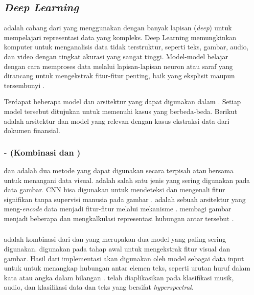 \subsection{\emph{Deep Learning}}
\label{subsec:dl}

\dlfl{} adalah cabang dari \ml{} yang menggunakan \annfull{} dengan banyak lapisan (\emph{deep}) untuk mempelajari representasi data yang kompleks. Deep Learning memungkinkan komputer untuk menganalisis data tidak terstruktur, seperti teks, gambar, audio, dan video dengan tingkat akurasi yang sangat tinggi. Model-model \dl{} belajar dengan cara memproses data melalui lapisan-lapisan neuron atau saraf yang dirancang untuk mengekstrak fitur-fitur penting, baik yang eksplisit maupun tersembunyi \parencite{Goodfellow-et-al-2016}. 

Terdapat beberapa model dan arsitektur yang dapat digunakan dalam \dl. Setiap model tersebut ditujukan untuk memenuhi kasus yang berbeda-beda. Berikut adalah arsitektur dan model yang relevan dengan kasus ekstraksi data dari dokumen finansial.

\subsubsection {\cnn\--\transformer{} (Kombinasi \cnn{} dan \transformer)}
\cnn{} dan \transformer{} adalah dua metode yang dapat digunakan secara terpisah atau bersama untuk menangani data visual. \cnn{} adalah salah satu jenis \MakeLowercase{{\nn{}}} yang sering digunakan pada data gambar. CNN bisa digunakan untuk mendeteksi dan mengenali fitur signifikan tanpa supervisi manusia pada gambar \parencite{alzubaidi2021review}. \transformer{} adalah sebuah arsitektur \MakeLowercase{\nn{}} yang meng-\emph{encode} data menjadi fitur-fitur melalui mekanisme \attention. \transformer{} membagi gambar menjadi beberapa \patch{} dan mengkalkulasi representasi hubungan antar \patch{} tersebut \parencite{han2021transformer}. 

\subsubsection{\crnnfull}
\crnn{} adalah kombinasi dari \cnn{} dan \rnn{} yang merupakan dua model yang paling sering digunakan. \cnn{} digunakan pada tahap awal untuk mengekstrak fitur visual dan gambar. Hasil dari implementasi \cnn{} akan digunakan oleh model \rnn{} sebagai data input untuk untuk menangkap hubungan antar elemen teks, seperti urutan huruf dalam kata atau angka dalam bilangan \parencite{wang2019convolutional}. \crnn{} telah diaplikasikan pada klasifikasi musik, audio, dan klasifikasi data dan teks yang bersifat \emph{hyperspectral}.


